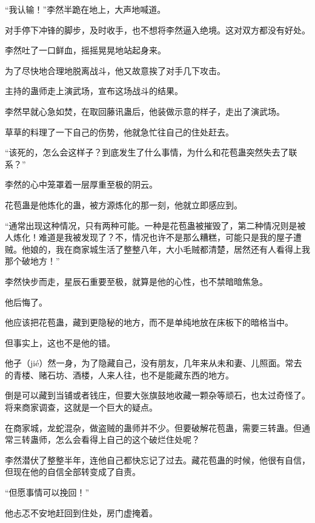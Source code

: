 
\begin{this_body}



“我认输！”李然半跪在地上，大声地喊道。

对手停下冲锋的脚步，及时收手，也不想将李然逼入绝境。这对双方都没有好处。

李然吐了一口鲜血，摇摇晃晃地站起身来。

为了尽快地合理地脱离战斗，他又故意挨了对手几下攻击。

主持的蛊师走上演武场，宣布这场战斗的结果。

李然早就心急如焚，在取回藤讯蛊后，他装做示意的样子，走出了演武场。

草草的料理了一下自己的伤势，他就急忙往自己的住处赶去。

“该死的，怎么会这样子？到底发生了什么事情，为什么和花苞蛊突然失去了联系？”

李然的心中笼罩着一层厚重至极的阴云。

花苞蛊是他炼化的蛊，被方源炼化的那一刻，他就立即感应到。

“通常出现这种情况，只有两种可能。一种是花苞蛊被摧毁了，第二种情况则是被人炼化！难道是我被发现了？不，情况也许不是那么糟糕，可能只是我的屋子遭贼。他娘的，我在商家城生活了整整八年，大小毛贼都清楚，居然还有人看得上我那个破地方！”

李然快步而走，星辰石重要至极，就算是他的心性，也不禁暗暗焦急。

他后悔了。

他应该把花苞蛊，藏到更隐秘的地方，而不是单纯地放在床板下的暗格当中。

但事实上，这也不是他的错。

他孑（jié）然一身，为了隐藏自己，没有朋友，几年来从未和妻、儿照面。常去的青楼、赌石坊、酒楼，人来人往，也不是能藏东西的地方。

倒是可以藏到当铺或者钱庄，但要大张旗鼓地收藏一颗杂等顽石，也太过奇怪了。将来商家调查，这就是一个巨大的疑点。

在商家城，龙蛇混杂，做盗贼的蛊师并不少。但要破解花苞蛊，需要三转蛊。但通常三转蛊师，怎么会看得上自己的这个破烂住处呢？

李然潜伏了整整半年，连他自己都快忘记了过去。藏花苞蛊的时候，他很有自信，但现在他的自信全部转变成了自责。

“但愿事情可以挽回！”

他忐忑不安地赶回到住处，房门虚掩着。


\end{this_body}
